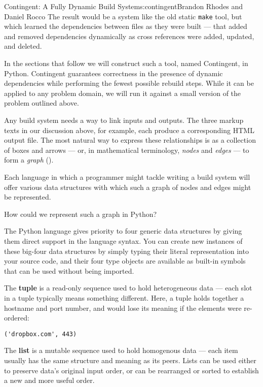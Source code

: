 \begin{aosachapter}{Contingent: A Fully Dynamic Build System}{s:contingent}{Brandon Rhodes and Daniel Rocco}
The result would be a system like the old static \texttt{make} tool, but
which learned the dependencies between files as they were built --- that
added and removed dependencies dynamically as cross references were
added, updated, and deleted.

In the sections that follow we will construct such a tool, named
Contingent, in Python. Contingent guarantees correctness in the presence
of dynamic dependencies while performing the fewest possible rebuild
steps. While it can be applied to any problem domain, we will run it
against a small version of the problem outlined above.

\label{linking-tasks-to-make-a-graph}

Any build system needs a way to link inputs and outputs. The three
markup texts in our discussion above, for example, each produce a
corresponding HTML output file. The most natural way to express these
relationships is as a collection of boxes and arrows --- or, in
mathematical terminology, \emph{nodes} and \emph{edges} --- to form a
\emph{graph} ().


Each language in which a programmer might tackle writing a build system
will offer various data structures with which such a graph of nodes and
edges might be represented.

How could we represent such a graph in Python?

The Python language gives priority to four generic data structures by
giving them direct support in the language syntax. You can create new
instances of these big-four data structures by simply typing their
literal representation into your source code, and their four type
objects are available as built-in symbols that can be used without being
imported.

The \textbf{tuple} is a read-only sequence used to hold heterogeneous
data --- each slot in a tuple typically means something different. Here,
a tuple holds together a hostname and port number, and would lose its
meaning if the elements were re-ordered:

\begin{verbatim}
('dropbox.com', 443)
\end{verbatim}

The \textbf{list} is a mutable sequence used to hold homogenous data ---
each item usually has the same structure and meaning as its peers. Lists
can be used either to preserve data's original input order, or can be
rearranged or sorted to establish a new and more useful order.


\end{aosachapter}

